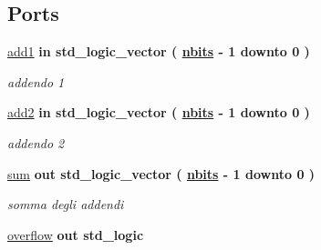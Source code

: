\subsection*{Ports}
 \begin{DoxyCompactItemize}
\item 
\hyperlink{group___adder_gad6ed6073f8ded668a403a0f7d85c53e8}{add1}  {\bfseries {\bfseries \textcolor{vhdlchar}{in}\textcolor{vhdlchar}{ }}} {\bfseries \textcolor{vhdlchar}{std\+\_\+logic\+\_\+vector}\textcolor{vhdlchar}{ }\textcolor{vhdlchar}{(}\textcolor{vhdlchar}{ }\textcolor{vhdlchar}{ }\textcolor{vhdlchar}{ }\textcolor{vhdlchar}{ }{\bfseries \hyperlink{group___adder_gae1435c07d0cd54b521535e2f8de6f94e}{nbits}} \textcolor{vhdlchar}{-\/}\textcolor{vhdlchar}{ } \textcolor{vhdldigit}{1} \textcolor{vhdlchar}{ }\textcolor{vhdlchar}{downto}\textcolor{vhdlchar}{ }\textcolor{vhdlchar}{ } \textcolor{vhdldigit}{0} \textcolor{vhdlchar}{ }\textcolor{vhdlchar}{)}\textcolor{vhdlchar}{ }} 
\begin{DoxyCompactList}\small\item\em addendo 1 \end{DoxyCompactList}\item 
\hyperlink{group___adder_gabf87ad241134c4d313c708910677575e}{add2}  {\bfseries {\bfseries \textcolor{vhdlchar}{in}\textcolor{vhdlchar}{ }}} {\bfseries \textcolor{vhdlchar}{std\+\_\+logic\+\_\+vector}\textcolor{vhdlchar}{ }\textcolor{vhdlchar}{(}\textcolor{vhdlchar}{ }\textcolor{vhdlchar}{ }\textcolor{vhdlchar}{ }\textcolor{vhdlchar}{ }{\bfseries \hyperlink{group___adder_gae1435c07d0cd54b521535e2f8de6f94e}{nbits}} \textcolor{vhdlchar}{-\/}\textcolor{vhdlchar}{ } \textcolor{vhdldigit}{1} \textcolor{vhdlchar}{ }\textcolor{vhdlchar}{downto}\textcolor{vhdlchar}{ }\textcolor{vhdlchar}{ } \textcolor{vhdldigit}{0} \textcolor{vhdlchar}{ }\textcolor{vhdlchar}{)}\textcolor{vhdlchar}{ }} 
\begin{DoxyCompactList}\small\item\em addendo 2 \end{DoxyCompactList}\item 
\hyperlink{group___adder_ga01f6ea3ddb4d1519676217bcb5959de8}{sum}  {\bfseries {\bfseries \textcolor{vhdlchar}{out}\textcolor{vhdlchar}{ }}} {\bfseries \textcolor{vhdlchar}{std\+\_\+logic\+\_\+vector}\textcolor{vhdlchar}{ }\textcolor{vhdlchar}{(}\textcolor{vhdlchar}{ }\textcolor{vhdlchar}{ }\textcolor{vhdlchar}{ }\textcolor{vhdlchar}{ }{\bfseries \hyperlink{group___adder_gae1435c07d0cd54b521535e2f8de6f94e}{nbits}} \textcolor{vhdlchar}{-\/}\textcolor{vhdlchar}{ } \textcolor{vhdldigit}{1} \textcolor{vhdlchar}{ }\textcolor{vhdlchar}{downto}\textcolor{vhdlchar}{ }\textcolor{vhdlchar}{ } \textcolor{vhdldigit}{0} \textcolor{vhdlchar}{ }\textcolor{vhdlchar}{)}\textcolor{vhdlchar}{ }} 
\begin{DoxyCompactList}\small\item\em somma degli addendi \end{DoxyCompactList}\item 
\hyperlink{group___adder_ga9650307dde287e0bcfa1e26370c006c2}{overflow}  {\bfseries {\bfseries \textcolor{vhdlchar}{out}\textcolor{vhdlchar}{ }}} {\bfseries \textcolor{vhdlchar}{std\+\_\+logic}\textcolor{vhdlchar}{ }} 
\end{DoxyCompactItemize}
